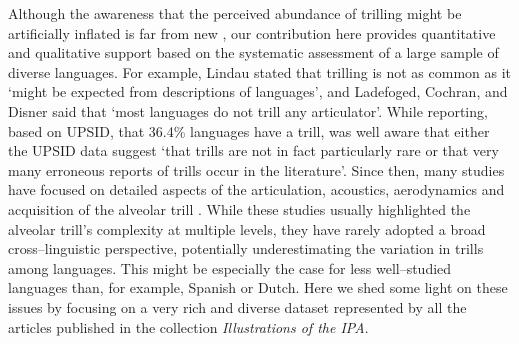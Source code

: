 Although the awareness that the perceived abundance of trilling might be artificially inflated is far from new \parencite{whitleyRhoticRepresentationProblems2003}, our contribution here provides quantitative and qualitative support based on the systematic assessment of a large sample of diverse languages. For example, Lindau \parencite*[616]{lindauStory1985} stated that trilling is not as common as it ‘might be expected from descriptions of languages’, and Ladefoged, Cochran, and Disner \parencite*[46]{ladefogedLateralsTrills1977}  said that ‘most languages do not trill any articulator’. While reporting, based on UPSID, that 36.4\% languages have a trill, \textcites[89]{maddiesonPatternsSounds1984} was well aware that either the UPSID data suggest ‘that trills are not in fact particularly rare or that very many erroneous reports of trills occur in the literature’. Since then, many studies have focused on detailed aspects of the articulation, acoustics, aerodynamics and acquisition of the alveolar trill \parencites{recasensStudyLightDAC1999,solePhonologicalUniversalsTrilling1998,soleAerodynamicCharacteristicsTrills2002,boyceAcquiringRhoticityLanguages2016}. While these studies usually highlighted the alveolar trill’s complexity at multiple levels, they have rarely adopted a broad cross–linguistic perspective, potentially underestimating the variation in trills among languages. This might be especially the case for less well–studied languages than, for example, Spanish or Dutch. Here we shed some light on these issues by focusing on a very rich and diverse dataset represented by all the articles published in the collection \textit{Illustrations of the IPA}. \\

